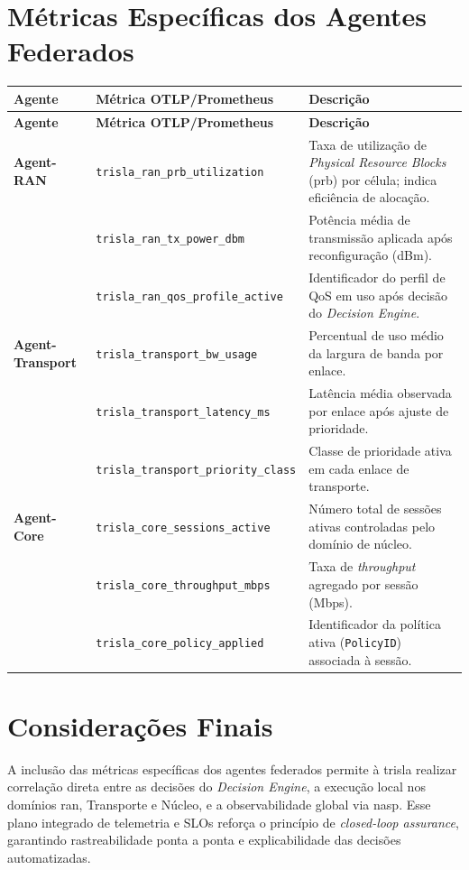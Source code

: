 \section{Métricas Específicas dos Agentes Federados}
{\scriptsize
\setlength{\tabcolsep}{3pt}
\begin{longtable}{L{3.2cm} L{4.5cm} L{7.0cm}}
\toprule
\textbf{Agente} & \textbf{Métrica OTLP/Prometheus} & \textbf{Descrição} \\
\midrule
\endfirsthead
\toprule
\textbf{Agente} & \textbf{Métrica OTLP/Prometheus} & \textbf{Descrição} \\
\midrule
\endhead
\textbf{Agent-RAN} &
\texttt{trisla\_ran\_prb\_utilization} &
Taxa de utilização de \textit{Physical Resource Blocks} (\ac{prb}) por célula; indica eficiência de alocação. \\
&
\texttt{trisla\_ran\_tx\_power\_dbm} &
Potência média de transmissão aplicada após reconfiguração (dBm). \\
&
\texttt{trisla\_ran\_qos\_profile\_active} &
Identificador do perfil de QoS em uso após decisão do \textit{Decision Engine}. \\ \midrule
\textbf{Agent-Transport} &
\texttt{trisla\_transport\_bw\_usage} &
Percentual de uso médio da largura de banda por enlace. \\
&
\texttt{trisla\_transport\_latency\_ms} &
Latência média observada por enlace após ajuste de prioridade. \\
&
\texttt{trisla\_transport\_priority\_class} &
Classe de prioridade ativa em cada enlace de transporte. \\ \midrule
\textbf{Agent-Core} &
\texttt{trisla\_core\_sessions\_active} &
Número total de sessões ativas controladas pelo domínio de núcleo. \\
&
\texttt{trisla\_core\_throughput\_mbps} &
Taxa de \textit{throughput} agregado por sessão (Mbps). \\
&
\texttt{trisla\_core\_policy\_applied} &
Identificador da política ativa (\texttt{PolicyID}) associada à sessão. \\
\bottomrule
\end{longtable}
}

\section*{Considerações Finais}

A inclusão das métricas específicas dos agentes federados permite à \ac{trisla} realizar correlação direta entre as decisões do \textit{Decision Engine}, a execução local nos domínios \ac{ran}, Transporte e Núcleo, e a observabilidade global via \ac{nasp}.  
Esse plano integrado de telemetria e \acp{SLO} reforça o princípio de \textit{closed-loop assurance}, garantindo rastreabilidade ponta a ponta e explicabilidade das decisões automatizadas.
